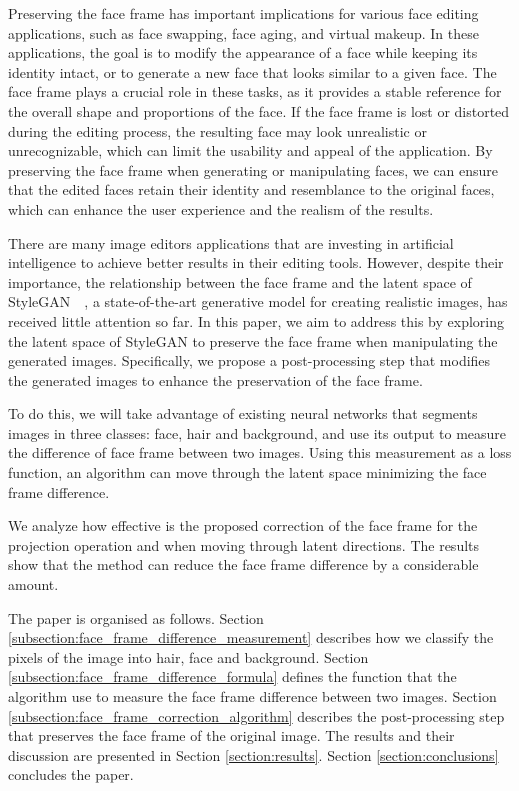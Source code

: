 \documentclass[review]{elsarticle}
\begin{document}
Preserving the face frame has important implications for various face editing applications, such as face swapping, face aging, and virtual makeup. In these applications, the goal is to modify the appearance of a face while keeping its identity intact, or to generate a new face that looks similar to a given face. The face frame plays a crucial role in these tasks, as it provides a stable reference for the overall shape and proportions of the face. If the face frame is lost or distorted during the editing process, the resulting face may look unrealistic or unrecognizable, which can limit the usability and appeal of the application. By preserving the face frame when generating or manipulating faces, we can ensure that the edited faces retain their identity and resemblance to the original faces, which can enhance the user experience and the realism of the results.

There are many image editors applications that are investing in artificial intelligence to achieve better results in their editing tools. %
However, despite their importance, the relationship between the face frame and the latent space of StyleGAN~\cite{stylegan1}~\cite{stylegan2}, a state-of-the-art generative model for creating realistic images, has received little attention so far. In this paper, we aim to address this by exploring the latent space of StyleGAN to preserve the face frame when manipulating the generated images. Specifically, we propose a post-processing step that modifies the generated images to enhance the preservation of the face frame.

To do this, we will take advantage of existing neural networks that segments images in three classes: face, hair and background, and use its output to measure the difference of face frame between two images. Using this measurement as a loss function, an algorithm can move through the latent space minimizing the face frame difference.

We analyze how effective is the proposed correction of the face frame for the projection operation and when moving through latent directions. The results show that the method can reduce the face frame difference by a considerable amount.

The paper is organised as follows. Section \ref{subsection:face_frame_difference_measurement} describes how we classify the pixels of the image into hair, face and background. Section \ref{subsection:face_frame_difference_formula} defines the function that the algorithm use to measure the face frame difference between two images. Section \ref{subsection:face_frame_correction_algorithm} describes the post-processing step that preserves the face frame of the original image. The results and their discussion are presented in Section \ref{section:results}. Section \ref{section:conclusions} concludes the paper.
\end{document}
